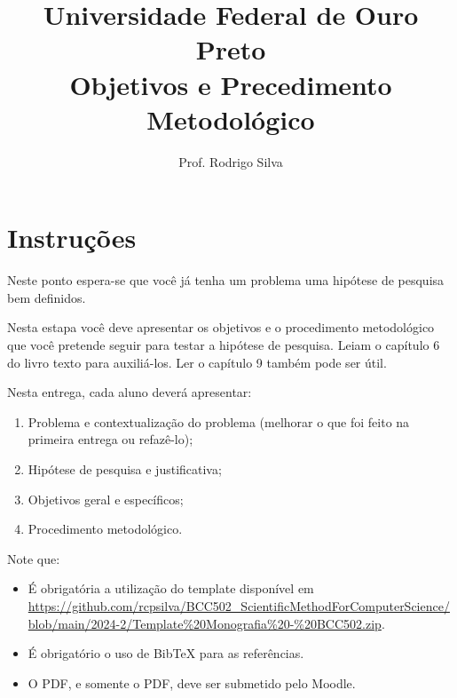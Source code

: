 \documentclass{article}
\title{\vspace{-2cm}Universidade Federal de Ouro Preto \\ Objetivos e Precedimento Metodológico}
\author{Prof. Rodrigo Silva}
\date{}
\begin{document}
\maketitle

\section*{Instruções}

Neste ponto espera-se que você já tenha um problema uma hipótese de pesquisa bem definidos.

Nesta estapa você deve apresentar os objetivos e o procedimento metodológico que você pretende seguir para testar a hipótese de pesquisa. Leiam o capítulo 6 do livro texto para auxiliá-los. Ler o capítulo 9 também pode ser útil.

Nesta entrega, cada aluno deverá apresentar:
\begin{enumerate}
    \item Problema e contextualização do problema (melhorar o que foi feito na primeira entrega ou refazê-lo);
    \item Hipótese de pesquisa e justificativa;
    \item Objetivos geral e específicos;
    \item Procedimento metodológico.
\end{enumerate}

Note que:
\begin{itemize}
    \item É obrigatória a utilização do template disponível em \url{https://github.com/rcpsilva/BCC502_ScientificMethodForComputerScience/blob/main/2024-2/Template%20Monografia%20-%20BCC502.zip}.
    \item É obrigatório o uso de BibTeX para as referências.
    \item O PDF, e somente o PDF, deve ser submetido pelo Moodle.
\end{itemize}

%
%
\end{document}
